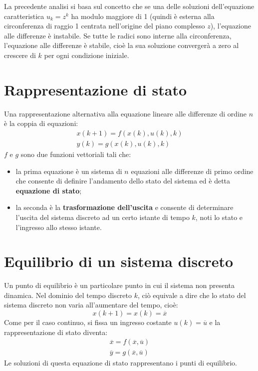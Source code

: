 \documentclass[a4paper]{report}
\newcommand{\bo}{\bfseries }
\begin{document}
La precedente analisi si basa sul concetto che se una delle soluzioni
dell'equazione caratteristica $u_k = z^k$ ha modulo maggiore di 1
(quindi \`e esterna alla circonferenza di raggio 1 centrata
nell'origine del piano complesso $z$), l'equazione alle differenze \`e
instabile. Se tutte le radici sono interne alla circonferenza,
l'equazione alle differenze \`e stabile, cio\`e la sua soluzione
converger\`a a zero al crescere di $k$ per ogni condizione iniziale.

\section{Rappresentazione di stato}
Una rappresentazione alternativa alla equazione lineare alle
differenze di ordine $n$ \`e la coppia di equazioni:
\[
\begin{array}{l}
  x(k + 1) = f(x(k), u(k), k)\\
  y(k) = g(x(k), u(k), k)
\end{array}
\]
$f$ e $g$ sono due funzioni vettoriali tali che:
\begin{itemize}
\item la prima equazione \`e un sistema di $n$ equazioni alle
  differenze di primo ordine che consente di definire l'andamento
  dello stato del sistema ed \`e detta {\bo equazione di stato};
\item la seconda \`e la {\bo trasformazione dell'uscita} e consente di
  determinare l'uscita del sistema discreto ad un certo istante di
  tempo $k$, noti lo stato e l'ingresso allo stesso istante.
\end{itemize}

\section{Equilibrio di un sistema discreto}
Un punto di equilibrio \`e un particolare punto in cui il sistema non
presenta dinamica. Nel dominio del tempo discreto $k$, ci\`o equivale
a dire che lo stato del sistema discreto non varia all'aumentare del
tempo, cio\`e:
\[
x(k + 1) = x(k) = \overline{x}
\]
Come per il caso continuo, si fissa un ingresso costante $u(k) =
\overline{u}$ e la rappresentazione di stato diventa:
\[
\begin{array}{l}
  \overline{x} = f (\overline{x},\overline{u})\\
  \overline{y} = g (\overline{x}, \overline{u})
\end{array}
\]
Le soluzioni di questa equazione di stato rappresentano i punti di
equilibrio.
\end{document}
